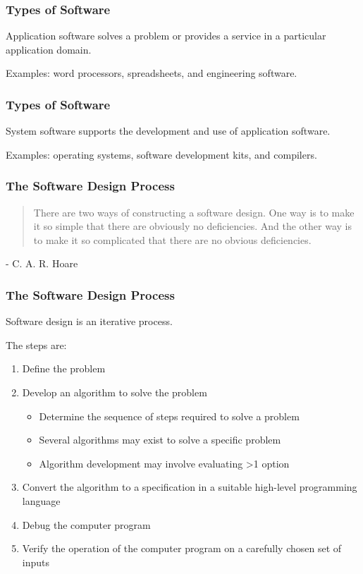 \begin{frame}
\frametitle{Types of Software}

\alert{Application software} solves a problem or provides a service in a particular application domain.

Examples: word processors, spreadsheets, and engineering software.
\end{frame}

\begin{frame}
\frametitle{Types of Software}
\alert{System software} supports the development and use of application software.

Examples: operating systems, software development kits, and compilers.

\end{frame}


\begin{frame}
\frametitle{The Software Design Process}

\vspace{5em}

\begin{quote}
There are two ways of constructing a software design. One way is to make it so simple that there are obviously no deficiencies. And the other way is to make it so complicated that there are no obvious deficiencies.
\end{quote}
\hfill - C. A. R. Hoare


\end{frame}

\begin{frame}
\frametitle{The Software Design Process}


Software design is an iterative process.

The steps are:
\begin{enumerate}
	\item Define the problem
	\item Develop an algorithm to solve the problem
	\begin{itemize}
		\item Determine the sequence of steps required to solve a problem
		\item Several algorithms may exist to solve a specific problem
		\item Algorithm development may involve evaluating >1 option
	\end{itemize}
	\item Convert the algorithm to a specification in a suitable high-level programming language
	\item Debug the computer program
	\item Verify the operation of the computer program on a carefully chosen set of inputs
\end{enumerate}

\end{frame}

